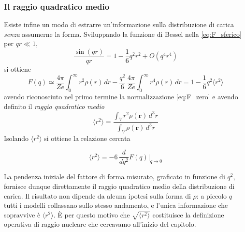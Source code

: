 \subsubsection*{Il raggio quadratico medio}

Esiste infine un modo di estrarre un'informazione sulla distribuzione di carica \emph{senza} assumerne la forma. Sviluppando la funzione di Bessel nella \eqref{eq:F_sferico} per $qr \ll 1$,
\begin{equation*}
    \frac{\sin(qr)}{qr} = 1 - \frac{1}{6}q^2r^2 + O(q^4r^4)
\end{equation*}
si ottiene
\begin{equation*}
    F(q) \simeq \frac{4\pi}{Ze}\int_0^{\infty} r^2\rho(r)\,dr - \frac{q^2}{6}\,\frac{4\pi}{Ze}\int_0^{\infty} r^4\rho(r)\,dr = 1 - \frac{1}{6}q^2\langle r^2\rangle
\end{equation*}
avendo riconosciuto nel primo termine la normalizzazione \eqref{eq:F_zero} e avendo definito il \emph{raggio quadratico medio}
\begin{equation}
    \langle r^2\rangle = \frac{\int_V r^2\rho(\mathbf{r})\,d^3r}{\int_V \rho(\mathbf{r})\,d^3r}
    \label{eq:r2_def}
\end{equation}
Isolando $\langle r^2\rangle$ si ottiene la relazione cercata
\begin{tcolorbox}[colback=black!5!white, colframe=black!45!white, boxrule=0.8pt]
\begin{equation}
    \langle r^2\rangle = -6\,\frac{d}{dq^2}F(q)\bigg|_{q\to 0}
    \label{eq:r2_derivata}
\end{equation}
\end{tcolorbox}
La pendenza iniziale del fattore di forma misurato, graficato in funzione di $q^2$, fornisce dunque direttamente il raggio quadratico medio della distribuzione di carica. Il risultato non dipende da alcuna ipotesi sulla forma di $\rho$: a piccolo $q$ tutti i modelli collassano sullo stesso andamento, e l'unica informazione che sopravvive è $\langle r^2\rangle$. È per questo motivo che $\sqrt{\langle r^2\rangle}$ costituisce la definizione operativa di raggio nucleare che cercavamo all'inizio del capitolo.